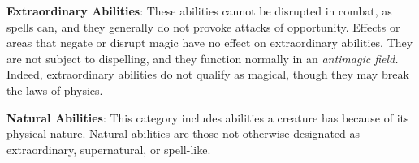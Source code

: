 \textbf{Extraordinary Abilities}: These abilities cannot be disrupted in combat, as spells can, and they generally do not provoke attacks of opportunity. Effects or areas that negate or disrupt magic have no effect on extraordinary abilities. They are not subject to dispelling, and they function normally in an \textit{antimagic field. }Indeed, extraordinary abilities do not qualify as magical, though they may break the laws of physics.
				
\textbf{Natural Abilities}: This category includes abilities a creature has because of its physical nature. Natural abilities are those not otherwise designated as extraordinary, supernatural, or spell-like.

